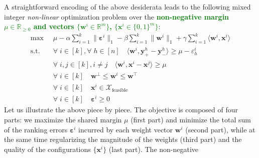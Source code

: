 \documentclass{article}
\renewcommand\[{\begin{equation}}
\renewcommand\]{\end{equation}}
\newcommand{\bbR}{\mathbb{R}}
\newcommand{\calvar}[1]{\ensuremath{\mathcal{#1}}}
\newcommand{\calX}{\calvar{X}}
\newcommand{\vecvar}[1]{\ensuremath{\boldsymbol{#1}}}
\newcommand{\vw}{\vecvar{w}}
\newcommand{\vx}{\vecvar{x}}
\newcommand{\vy}{\vecvar{y}}
\newcommand{\veps}{\vecvar{\varepsilon}}
\DeclareMathOperator*{\argmax}{argmax}
\newcommand{\stefano}[1]{{\bf \textcolor{green}{{\fbox{Stefano:} #1}}}}
\begin{document}

A straightforward encoding of the above desiderata leads to the
following mixed integer {\em non-linear} optimization problem over the
\stefano{non-negative margin $\mu \in \bbR_{\ge 0}$ and vectors $\{ \vw^i \in \bbR^m \}$, $\{ \vx^i \in \{0,1\}^m \}$}:
%
{\footnotesize
\begin{align}
    \max
        & \;\; \mu - \alpha \sum_{i=1}^k \| \veps^{i} \|_1 - \beta \sum_{i=1}^k \| \vw^{i} \|_1 + \gamma \sum_{i=1}^k \langle \vw^{i}, \vx^{i} \rangle
        \nonumber
    \\
    \text{s.t.}
        & \;\; \forall \; i \in [k], \forall \; h \in [n] \quad \langle \vw^{i}, \vy^{h}_+ - \vy^{h}_- \rangle \ge \mu - \varepsilon^{i}_h \label{eq:wyconstr}
    \\
        & \;\; \forall \; i, j \in [k], i \neq j \quad \langle \vw^{i}, \vx^{i} - \vx^{j} \rangle \ge \mu \label{eq:wxconstr}
    \\
        & \;\; \forall \; i \in [k] \quad \vw^\bot \le \vw^{i} \le \vw^\top \label{eq:wbounds}
    \\
        & \;\; \forall \; i \in [k] \quad \vx^{i} \in \calX_{\text{feasible}} \label{eq:xbounds}
    \\
        & \;\; \forall \; i \in [k] \quad \veps^{i} \ge 0 \nonumber
\end{align}
}
%
Let us illustrate the above piece by piece. The objective is composed
of four parts: we maximize the shared margin $\mu$ (first part) and
minimize the total sum of the ranking errors $\veps^i$ incurred by
each weight vector $\vw^{i}$ (second part), while at the same time
regularizing the magnitude of the weights (third part) and the quality
of the configurations $\{ \vx^{i} \}$ (last part). The non-negative
\end{document}
